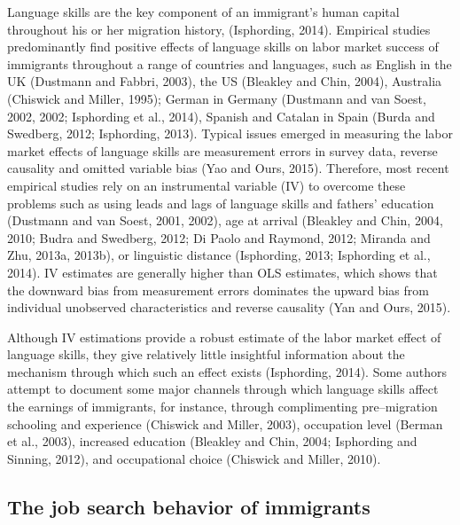 \documentclass[12pt,a4paper]{article}
\begin{document}
Language skills are the key component of an immigrant's human capital throughout his or her migration history,  (Isphording, 2014). Empirical studies predominantly find positive effects of language skills on labor market success of immigrants throughout a range of countries and languages, such as English in the UK (Dustmann and Fabbri, 2003), the US (Bleakley and Chin, 2004), Australia (Chiswick and Miller, 1995); German in Germany (Dustmann and van Soest, 2002, 2002; Isphording et al., 2014), Spanish and Catalan in Spain (Burda and Swedberg, 2012; Isphording, 2013). Typical issues emerged in measuring the labor market effects of language skills are measurement errors in survey data, reverse causality and omitted variable bias (Yao and Ours, 2015). Therefore, most recent empirical studies rely on an instrumental variable (IV) to overcome these problems such as using leads and lags of language skills and fathers' education (Dustmann and van Soest, 2001, 2002), age at arrival (Bleakley and Chin, 2004, 2010; Budra and Swedberg, 2012; Di Paolo and Raymond, 2012; Miranda and Zhu, 2013a, 2013b), or linguistic distance (Isphording, 2013; Isphording et al., 2014). IV estimates are generally higher than OLS estimates, which shows that the downward bias from measurement errors dominates the upward bias from individual unobserved characteristics and reverse causality (Yan and Ours, 2015).

Although IV estimations provide a robust estimate of the labor market effect of language skills, they give relatively little insightful information about the mechanism through which such an effect exists (Isphording, 2014). Some authors attempt to document some major channels through which language skills affect the earnings of immigrants, for instance, through complimenting pre--migration schooling and experience (Chiswick and Miller, 2003), occupation level (Berman et al., 2003), increased education (Bleakley and Chin, 2004; Isphording and Sinning, 2012), and occupational choice (Chiswick and Miller, 2010).



\subsection{The job search behavior of immigrants}
\end{document}
